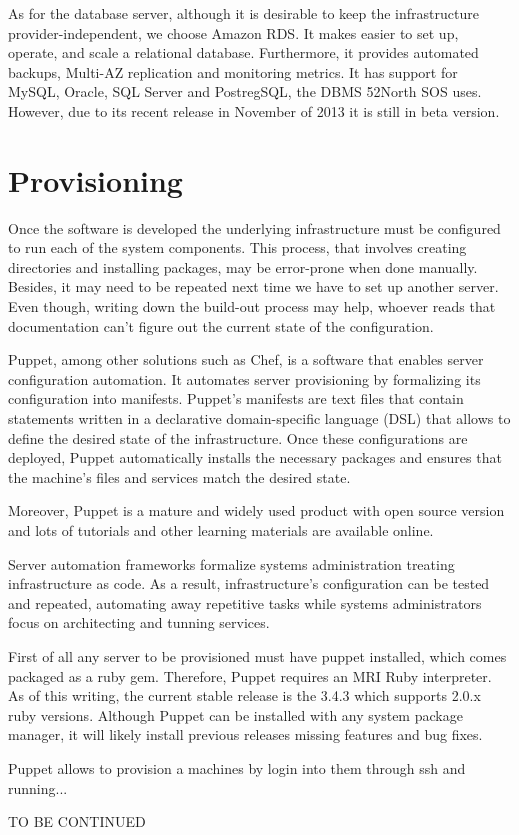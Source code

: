 As for the database server, although it is desirable to keep the infrastructure provider-independent, we choose Amazon RDS. It makes easier to set up, operate, and scale a relational database. Furthermore, it provides automated backups, Multi-AZ replication and monitoring metrics. It has support for MySQL, Oracle, SQL Server and PostregSQL, the DBMS 52North SOS uses. However, due to its recent release in November of 2013 it is still in beta version.

\section{Provisioning}

Once the software is developed the underlying infrastructure must be configured to run each of the system components. This process, that involves creating directories and installing packages, may be error-prone when done manually. Besides, it may need to be repeated next time we have to set up another server. Even though, writing down the build-out process may help, whoever reads that documentation can't figure out the current state of the configuration.

Puppet, among other solutions such as Chef, is a software that enables server configuration automation. It automates server provisioning by formalizing its configuration into manifests. Puppet's manifests are text files that contain statements written in a declarative domain-specific language (DSL) that allows to define the desired state of the infrastructure. Once these configurations are deployed, Puppet automatically installs the necessary packages and ensures that the machine’s files and services match the desired state.

Moreover, Puppet is a mature and widely used product with open source version and lots of tutorials and other learning materials are available online.

Server automation frameworks formalize systems administration treating infrastructure as code. As a result, infrastructure's configuration can be tested and repeated, automating away repetitive tasks while systems administrators focus on architecting and tunning services.

First of all any server to be provisioned must have puppet installed, which comes packaged as a ruby gem. Therefore, Puppet requires an MRI Ruby interpreter. As of this writing, the current stable release is the 3.4.3 which supports 2.0.x ruby versions. Although Puppet can be installed with any system package manager, it will likely install previous releases missing features and bug fixes.

Puppet allows to provision a machines by login into them through ssh and running...

TO BE CONTINUED

